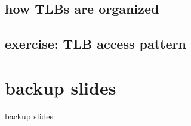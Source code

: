 \subsection{how TLBs are organized}

\subsection{exercise: TLB access pattern}






\section{backup slides}
\begin{frame}{backup slides}
\end{frame}


